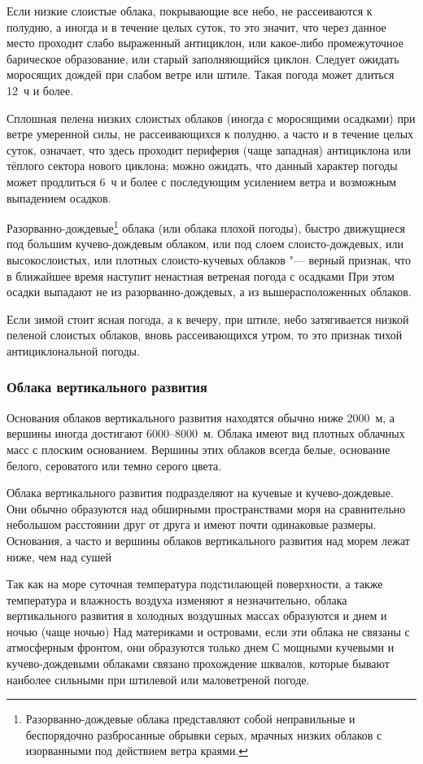  Если низкие слоистые облака, покрывающие все небо, не
рассеиваются к полудню, а иногда и в течение целых суток, то это
значит, что через данное место проходит слабо выраженный антициклон,
или какое-либо промежуточное барическое образование, или старый
заполняющийся циклон. Следует ожидать моросящих дождей при слабом
ветре или штиле. Такая погода может длиться 12~ч и более.

 Сплошная пелена низких слоистых облаков (иногда с моросящими
осадками) при ветре умеренной силы, не рассеивающихся к полудню, а
часто и в течение целых суток, означает, что здесь проходит периферия
(чаще западная) антициклона или тёплого сектора нового циклона; можно
ожидать, что данный характер погоды может продлиться 6~ч и более с
последующим усилением ветра и возможным выпадением осадков.

 Разорванно-дождевые\footnote{Разорванно-дождевые облака
  представляют собой неправильные и беспорядочно разбросанные обрывки
  серых, мрачных низких облаков с изорванными под действием ветра
  краями.} облака (или облака плохой погоды), быстро движущиеся под
большим кучево-дождевым облаком, или под слоем слоисто-дождевых, или
высокослоистых, или плотных слоисто-кучевых облаков "--- верный
признак, что в ближайшее время наступит ненастная ветреная погода с
осадками При этом осадки выпадают не из разорванно-дождевых, а из
вышерасположенных облаков.

 Если зимой стоит ясная погода, а к вечеру, при штиле, небо
затягивается низкой пеленой слоистых облаков, вновь рассеивающихся
утром, то это признак тихой антициклональной погоды.

\subsubsection{Облака вертикального развития}

Основания облаков вертикального развития находятся обычно ниже 2000~м,
а вершины иногда достигают 6000--8000~м. Облака имеют вид плотных
облачных масс с плоским основанием. Вершины этих облаков всегда белые,
основание белого, сероватого или темно серого цвета.

Облака вертикального развития подразделяют на кучевые и
кучево-дождевые. Они обычно образуются над обширными пространствами
моря на сравнительно небольшом расстоянии друг от друга и имеют почти
одинаковые размеры. Основания, а часто и вершины облаков вертикального
развития над морем лежат ниже, чем над сушей

Так как на море суточная температура подстилающей поверхности, а также
температура и влажность воздуха изменяют я незначительно, облака
вертикального развития в холодных воздушных массах образуются и днем и
ночью (чаще ночью) Над материками и островами, если эти облака не
связаны с атмосферным фронтом, они образуются только днем С мощными
кучевыми и кучево-дождевыми облаками связано прохождение шквалов,
которые бывают наиболее сильными при штилевой или маловетреной погоде.

